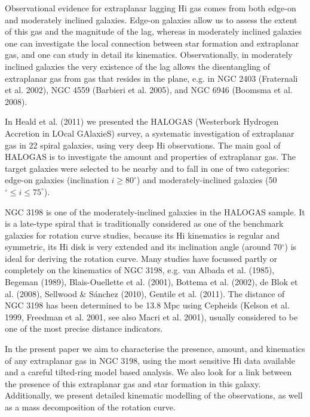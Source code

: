 \documentclass[traditabstract]{aa}
\begin{document}
Observational evidence for extraplanar lagging H{\sc i} gas comes from both
edge-on and moderately inclined galaxies. Edge-on galaxies allow us to
assess the extent of this gas and the magnitude of the lag,
whereas in moderately inclined galaxies one can investigate the local
connection between star formation
and extraplanar gas, and one can study in detail its kinematics. 
Observationally, in moderately inclined galaxies the
very existence of the lag allows the disentangling of extraplanar gas
from gas that resides in the plane, e.g. in NGC 2403 (Fraternali et
al. 2002), NGC 4559 (Barbieri et al. 2005), and NGC 6946 (Boomsma et
al. 2008). 

In Heald et al. (2011) we presented the HALOGAS (Westerbork Hydrogen
Accretion in LOcal GAlaxieS) survey, a systematic investigation of
extraplanar gas in 22 spiral galaxies, using very deep H{\sc i}
observations. The main goal of HALOGAS is to investigate the amount
and properties of extraplanar gas. The target galaxies were selected
to be nearby and to fall in one of two categories: edge-on galaxies
(inclination $i\geq 80^{\circ}$) and moderately-inclined galaxies
(50$^{\circ} \leq i \leq 75^{\circ}$). 

NGC 3198 is one of the moderately-inclined galaxies in the HALOGAS
sample. It is a late-type spiral that is traditionally considered as
one of the benchmark galaxies for rotation curve studies, because its
H{\sc i} kinematics is regular and symmetric, its H{\sc i} disk is very extended
and its inclination angle (around 70$^{\circ}$) is ideal for deriving the
rotation curve. Many studies have focussed partly or completely on
the kinematics of NGC 3198, e.g. van Albada et al. (1985), Begeman
(1989), Blais-Ouellette et al. (2001), Bottema et al. (2002), de Blok
et al. (2008), Sellwood \& S\'anchez (2010), Gentile et al. (2011). The
distance of NGC 3198 has been determined to be 13.8 Mpc using Cepheids
(Kelson et al. 1999, Freedman et al. 2001, see also Macri et
al. 2001), usually considered to be one of the most precise distance
indicators. 

In the present paper we aim to characterise the presence, amount, and
kinematics of any extraplanar gas in NGC 3198, using the most
sensitive H{\sc i} data available and a careful tilted-ring model based
analysis. We also look for a link between the presence of this
extraplanar gas and star formation in this galaxy. Additionally, we
present detailed kinematic modelling of the observations, as well as
a mass decomposition of the rotation curve.  
\end{document}
